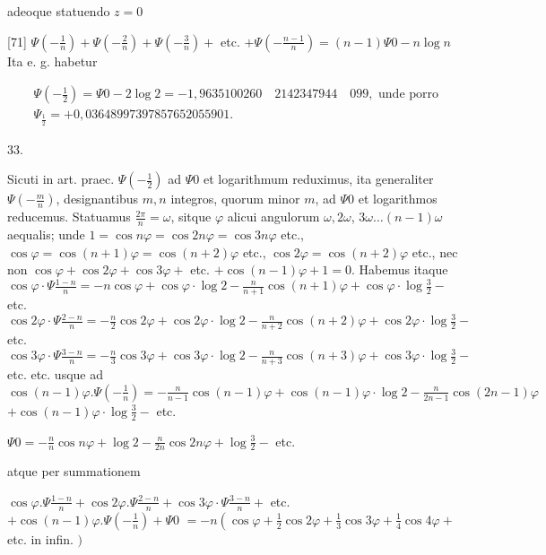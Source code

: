 \documentclass[10pt]{article}
\begin{document}
adeoque statuendo \(z=0\)

[71] \(\Psi\left(-\frac{1}{n}\right)+\Psi\left(-\frac{2}{n}\right)+\Psi\left(-\frac{3}{n}\right)+\) etc. \(+\Psi\left(-\frac{n-1}{n}\right)=(n-1) \Psi 0-n \log n\) Ita e. g. habetur

\[
\begin{aligned}
& \Psi\left(-\frac{1}{2}\right)=\Psi 0-2 \log 2=-1,9635100260 \quad 2142347944 \quad 099, \text { unde porro } \\
& \Psi_{\frac{1}{2}}=+0,03648997397857652055901 .
\end{aligned}
\]

33.

Sicuti in art. praec. \(\Psi\left(-\frac{1}{2}\right)\) ad \(\Psi 0\) et logarithmum reduximus, ita generaliter \(\Psi\left(-\frac{m}{n}\right)\), designantibus \(m, n\) integros, quorum minor \(m\), ad \(\Psi 0\) et logarithmos reducemus. Statuamus \(\frac{2 \pi}{n}=\omega\), sitque \(\varphi\) alicui angulorum \(\omega, 2 \omega\), \(3 \omega \ldots(n-1) \omega\) aequalis; unde \(1=\cos n \varphi=\cos 2 n \varphi=\cos 3 n \varphi\) etc., \(\cos \varphi=\cos (n+1) \varphi=\cos (n+2) \varphi\) etc., \(\cos 2 \varphi=\cos (n+2) \varphi\) etc., nec non \(\cos \varphi+\cos 2 \varphi+\cos 3 \varphi+\) etc. \(+\cos (n-1) \varphi+1=0\). Habemus itaque \(\cos \varphi \cdot \Psi \frac{1-n}{n}=-n \cos \varphi+\cos \varphi \cdot \log 2-\frac{n}{n+1} \cos (n+1) \varphi+\cos \varphi \cdot \log \frac{3}{2}-\) etc. \(\cos 2 \varphi \cdot \Psi \frac{2-n}{n}=-\frac{n}{2} \cos 2 \varphi+\cos 2 \varphi \cdot \log 2-\frac{n}{n+2} \cos (n+2) \varphi+\cos 2 \varphi \cdot \log \frac{3}{2}-\) etc. \(\cos 3 \varphi \cdot \Psi \frac{3-n}{n}=-\frac{n}{3} \cos 3 \varphi+\cos 3 \varphi \cdot \log 2-\frac{n}{n+3} \cos (n+3) \varphi+\cos 3 \varphi \cdot \log \frac{3}{2}-\) etc. etc. usque ad
\(\cos (n-1) \varphi . \Psi\left(-\frac{1}{n}\right)=-\frac{n}{n-1} \cos (n-1) \varphi+\cos (n-1) \varphi \cdot \log 2-\frac{n}{2 n-1} \cos (2 n-1) \varphi\)
\(+\cos (n-1) \varphi \cdot \log \frac{3}{2}-\) etc.

\(\Psi 0=-\frac{n}{n} \cos n \varphi+\log 2-\frac{n}{2 n} \cos 2 n \varphi+\log \frac{3}{2}-\) etc.

atque per summationem

\(\cos \varphi . \Psi \frac{1-n}{n}+\cos 2 \varphi . \Psi \frac{2-n}{n}+\cos 3 \varphi \cdot \Psi \frac{3-n}{n}+\) etc. \(+\cos (n-1) \varphi . \Psi\left(-\frac{1}{n}\right)+\Psi 0\) \(=-n\left(\cos \varphi+\frac{1}{2} \cos 2 \varphi+\frac{1}{3} \cos 3 \varphi+\frac{1}{4} \cos 4 \varphi+\right.\) etc. in infin. \()\)
\end{document}
